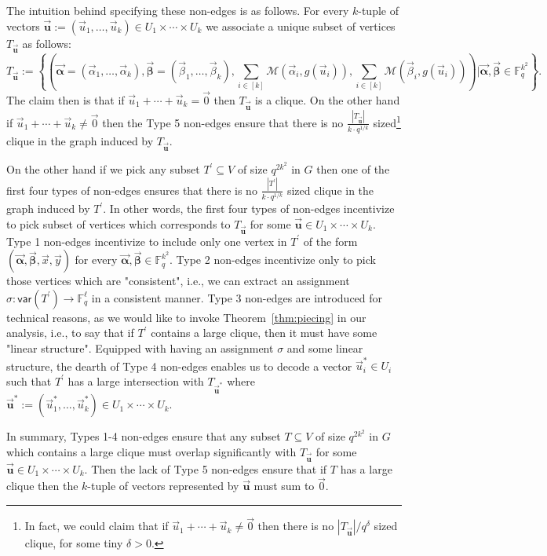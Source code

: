 \documentclass[11pt]{article}
\newcommand{\F}{\mathbb{F}}
\newcommand{\alphab}{\vec{\bm{\alpha}}}
\newcommand{\betab}{\vec{\bm{\beta}}}
\newcommand{\var}{\mathsf{var}}
\newcommand{\M}{\mathcal{M}}
\begin{document}
{The intuition behind specifying these non-edges is as follows. For every $k$-tuple of vectors $\vec{\bm{u}}:=(\vec{u}_1,\ldots ,\vec{u}_k)\in U_1\times \cdots \times U_k$ we associate a unique subset of vertices  $T_{\vec{\bm{u}}}$ as follows:
$$
T_{\vec{\bm{u}}}:=\left\{\left(\alphab=(\vec{\alpha}_1,\ldots ,\vec{\alpha}_{k}),\betab=(\vec{\beta}_1,\ldots ,\vec{\beta}_{k}),\sum_{i\in[k]}\M(\vec{\alpha}_i,g(\vec{u}_i)),\sum_{i\in[k]}\M(\vec{\beta}_i,g(\vec{u}_i))\right)\bigg| \alphab,\betab\in \F_q^{k^2}\right\}.
$$
The claim then is that if $\vec{u}_1+\cdots +\vec{u}_k=\vec{0}$ then $T_{\vec{\bm{u}}}$ is a clique. On the other hand if $\vec{u}_1+\cdots +\vec{u}_k\neq\vec{0}$ then the Type 5 non-edges ensure that there is no $\frac{|T_{\vec{\bm{u}}}|}{k\cdot q^{1/k}}$ sized\footnote{\label{footnote}In fact, we could claim that if $\vec{u}_1+\cdots +\vec{u}_k\neq\vec{0}$ then there is no $|T_{\vec{\bm{u}}}|/q^{\delta}$ sized clique, for some tiny $\delta>0$. } clique in the graph induced by $T_{\vec{\bm{u}}}$. 

On the other hand if we pick any subset $T^\prime\subseteq V$ of size $q^{2k^2}$ in $G$ then one of the first four types of non-edges ensures that there is no $\frac{|T^\prime|}{k\cdot q^{1/k}}$ sized clique in the graph induced by $T^\prime$. In other words, the first four types of non-edges incentivize to pick subset of vertices which corresponds to $T_{\vec{\bm{u}}}$ for some $\vec{\bm{u}}\in U_1\times \cdots \times U_k$. 
Type 1 non-edges incentivize to  include only one vertex in $T^\prime$ of the form $(\alphab,\betab,\vec{x},\vec{y})$ for every $\alphab,\betab\in \F_q^{k^2}$. Type 2 non-edges incentivize only to pick those vertices which are "consistent", i.e., we can extract an assignment $\sigma:\var(T^\prime)\to\F_q^\ell$ in a consistent manner.  Type 3 non-edges are introduced for technical reasons, as we would like to invoke Theorem~\ref{thm:piecing} in our analysis, i.e., to say that if $T^\prime$ contains a large clique, then it must have some "linear structure". Equipped with having an assignment $\sigma$ and some linear structure, the dearth of Type 4 non-edges enables us to decode a vector $\vec{u}_i^\ast\in U_i$ such that $T^\prime$ has a large intersection with $T_{\vec{\bm{u}}^\ast}$  where
$\vec{\bm{u}}^\ast:=(\vec{u}_1^\ast,\ldots ,\vec{u}_k^\ast)\in U_1\times \cdots \times U_k$. }

In summary, Types 1-4 non-edges ensure that any subset $T\subseteq V$ of size $q^{2k^2}$ in $G$ which contains a large clique must overlap significantly with  $T_{\vec{\bm{u}}}$ for some $\vec{\bm{u}}\in U_1\times \cdots \times U_k$. Then the lack of Type 5 non-edges ensure that if $T$ has a large clique then the $k$-tuple of vectors represented by $\vec{\bm{u}}$ must sum to $\vec{0}$.
\end{document}
